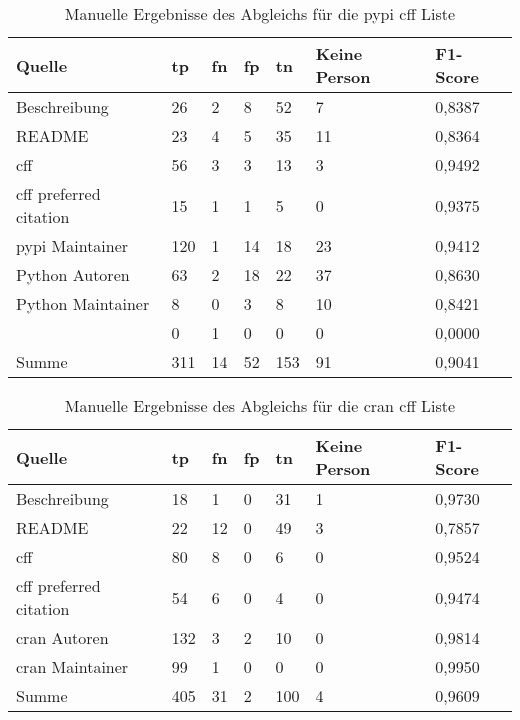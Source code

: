 \begin{table}[H]
    \centering
    \begin{tabularx}{\textwidth}{XR{.7cm}R{.7cm}R{.7cm}R{.7cm}R{2.8cm}R{2cm}}
        \toprule
        \textbf{Quelle} & \textbf{\gls{tp}} & \textbf{\gls{fn}} & \textbf{\gls{fp}} & \textbf{\gls{tn}} & \textbf{Keine Person} & \textbf{F1-Score} \\ \midrule
        Beschreibung                 & 26  & 2  & 8  & 52  & 7  & 0,8387 \\
        README                       & 23  & 4  & 5  & 35  & 11 & 0,8364 \\
        \gls{cff}                    & 56  & 3  & 3  & 13  & 3  & 0,9492 \\
        \gls{cff} preferred citation & 15  & 1  & 1  & 5   & 0  & 0,9375 \\
        \gls{pypi} Maintainer        & 120 & 1  & 14 & 18  & 23 & 0,9412 \\
        Python Autoren               & 63  & 2  & 18 & 22  & 37 & 0,8630 \\
        Python Maintainer            & 8   & 0  & 3  & 8   & 10 & 0,8421 \\
                      & 0   & 1  & 0  & 0   & 0  & 0,0000 \\ \midrule
        Summe                        & 311 & 14 & 52 & 153 & 91 & 0,9041 \\
        \bottomrule
    \end{tabularx}
    \caption{Manuelle Ergebnisse des Abgleichs für die \gls{pypi} \gls{cff} Liste}
    \label{tab:pypi_cff_matching_results_manual_anhang}
\end{table}

\begin{table}[H]
    \centering
    \begin{tabularx}{\textwidth}{XR{.7cm}R{.7cm}R{.7cm}R{.7cm}R{2.8cm}R{2cm}}
        \toprule
        \textbf{Quelle} & \textbf{\gls{tp}} & \textbf{\gls{fn}} & \textbf{\gls{fp}} & \textbf{\gls{tn}} & \textbf{Keine Person} & \textbf{F1-Score} \\ \midrule
        Beschreibung                 & 18  & 1  & 0 & 31  & 1 & 0,9730 \\
        README                       & 22  & 12 & 0 & 49  & 3 & 0,7857 \\
        \gls{cff}                    & 80  & 8  & 0 & 6   & 0 & 0,9524 \\
        \gls{cff} preferred citation & 54  & 6  & 0 & 4   & 0 & 0,9474 \\
        \gls{cran} Autoren           & 132 & 3  & 2 & 10  & 0 & 0,9814 \\
        \gls{cran} Maintainer        & 99  & 1  & 0 & 0   & 0 & 0,9950 \\ \midrule
        Summe                        & 405 & 31 & 2 & 100 & 4 & 0,9609 \\
        \bottomrule
    \end{tabularx}
    \caption{Manuelle Ergebnisse des Abgleichs für die \gls{cran} \gls{cff} Liste}
    \label{tab:cran_cff_matching_results_manual_anhang}
\end{table}
